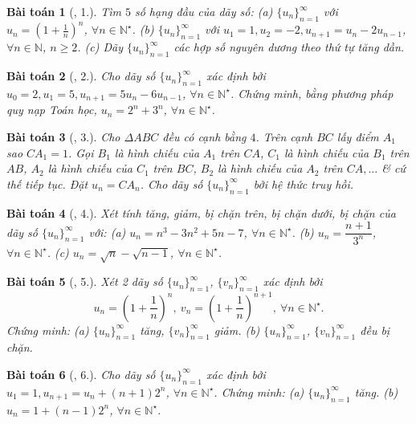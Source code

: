 \documentclass[oneside]{book}
\newtheorem{baitoan}{Bài toán}
\begin{document}
\begin{baitoan}[\cite{TLCT_dai_so_giai_tich_11}, 1.]
	Tìm $5$ số hạng đầu của dãy số: (a) $\{u_n\}_{n=1}^\infty$ với $u_n = \left(1 + \frac{1}{n}\right)^n$, $\forall n\in\mathbb{N}^\star$. (b) $\{u_n\}_{n=1}^\infty$ với $u_1 = 1,u_2 = -2,u_{n+1} = u_n - 2u_{n-1}$, $\forall n\in\mathbb{N}$, $n\ge2$. (c) Dãy $\{u_n\}_{n=1}^\infty$ các hợp số nguyên dương theo thứ tự tăng dần.
\end{baitoan}

\begin{baitoan}[\cite{TLCT_dai_so_giai_tich_11}, 2.]
	Cho dãy số $\{u_n\}_{n=1}^\infty$ xác định bởi $u_0 = 2,u_1 = 5,u_{n+1} = 5u_n - 6u_{n-1}$, $\forall n\in\mathbb{N}^\star$. Chứng minh, bằng phương pháp quy nạp Toán học, $u_n = 2^n + 3^n$, $\forall n\in\mathbb{N}^\star$.
\end{baitoan}

\begin{baitoan}[\cite{TLCT_dai_so_giai_tich_11}, 3.]
	Cho $\Delta ABC$ đều có cạnh bằng $4$. Trên cạnh $BC$ lấy điểm $A_1$ sao $CA_1 = 1$. Gọi $B_1$ là hình chiếu của $A_1$ trên $CA$, $C_1$ là hình chiếu của $B_1$ trên $AB$, $A_2$ là hình chiếu của $C_1$ trên $BC$, $B_2$ là hình chiếu của $A_2$ trên $CA,\ldots$ \& cứ thế tiếp tục. Đặt $u_n = CA_n$. Cho dãy số $\{u_n\}_{n=1}^\infty$ bởi hệ thức truy hồi.
\end{baitoan}

\begin{baitoan}[\cite{TLCT_dai_so_giai_tich_11}, 4.]
	Xét tính tăng, giảm, bị chặn trên, bị chặn dưới, bị chặn của dãy số $\{u_n\}_{n=1}^\infty$ với: (a) $u_n = n^3 - 3n^2 + 5n - 7$, $\forall n\in\mathbb{N}^\star$. (b) $u_n = \dfrac{n + 1}{3^n}$, $\forall n\in\mathbb{N}^\star$. (c) $u_n = \sqrt{n} - \sqrt{n - 1}$, $\forall n\in\mathbb{N}^\star$.
\end{baitoan}

\begin{baitoan}[\cite{TLCT_dai_so_giai_tich_11}, 5.]
	Xét 2 dãy số $\{u_n\}_{n=1}^\infty$, $\{v_n\}_{n=1}^\infty$ xác định bởi
	\begin{equation*}
		u_n = \left(1 + \frac{1}{n}\right)^n,\ v_n = \left(1 + \frac{1}{n}\right)^{n+1},\ \forall n\in\mathbb{N}^\star.
	\end{equation*}
	Chứng minh: (a) $\{u_n\}_{n=1}^\infty$ tăng, $\{v_n\}_{n=1}^\infty$ giảm. (b) $\{u_n\}_{n=1}^\infty$, $\{v_n\}_{n=1}^\infty$ đều bị chặn.
\end{baitoan}

\begin{baitoan}[\cite{TLCT_dai_so_giai_tich_11}, 6.]
	Cho dãy số $\{u_n\}_{n=1}^\infty$ xác định bởi $u_1 = 1,u_{n+1} = u_n + (n + 1)2^n$, $\forall n\in\mathbb{N}^\star$. Chứng minh: (a) $\{u_n\}_{n=1}^\infty$ tăng. (b) $u_n = 1 + (n - 1)2^n$, $\forall n\in\mathbb{N}^\star$.
\end{baitoan}
\end{document}
